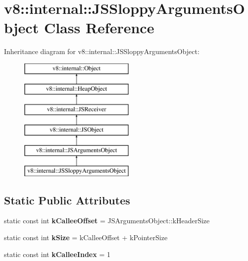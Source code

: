 \hypertarget{classv8_1_1internal_1_1_j_s_sloppy_arguments_object}{}\section{v8\+:\+:internal\+:\+:J\+S\+Sloppy\+Arguments\+Object Class Reference}
\label{classv8_1_1internal_1_1_j_s_sloppy_arguments_object}
Inheritance diagram for v8\+:\+:internal\+:\+:J\+S\+Sloppy\+Arguments\+Object\+:\begin{figure}[H]
\begin{center}
\leavevmode
\includegraphics[height=6.000000cm]{classv8_1_1internal_1_1_j_s_sloppy_arguments_object}
\end{center}
\end{figure}
\subsection*{Static Public Attributes}
\begin{DoxyCompactItemize}
\item 
static const int {\bfseries k\+Callee\+Offset} = J\+S\+Arguments\+Object\+::k\+Header\+Size\hypertarget{classv8_1_1internal_1_1_j_s_sloppy_arguments_object_af075b8e42a8c49c408403e2c783511d4}{}\label{classv8_1_1internal_1_1_j_s_sloppy_arguments_object_af075b8e42a8c49c408403e2c783511d4}

\item 
static const int {\bfseries k\+Size} = k\+Callee\+Offset + k\+Pointer\+Size\hypertarget{classv8_1_1internal_1_1_j_s_sloppy_arguments_object_ad87d33244ee094e34ef4425f4251da9b}{}\label{classv8_1_1internal_1_1_j_s_sloppy_arguments_object_ad87d33244ee094e34ef4425f4251da9b}

\item 
static const int {\bfseries k\+Callee\+Index} = 1\hypertarget{classv8_1_1internal_1_1_j_s_sloppy_arguments_object_a2fc5af0b8a0dbde4420f0f2380d116d9}{}\label{classv8_1_1internal_1_1_j_s_sloppy_arguments_object_a2fc5af0b8a0dbde4420f0f2380d116d9}

\end{DoxyCompactItemize}
